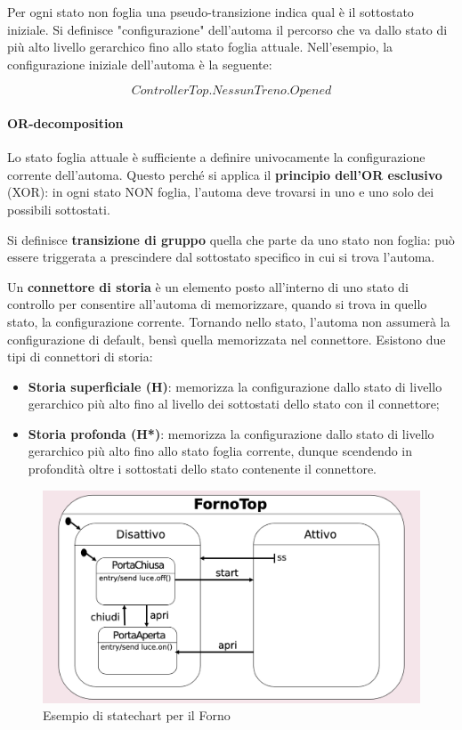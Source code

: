 Per ogni stato non foglia una pseudo-transizione indica qual è il sottostato iniziale. Si definisce "configurazione" dell'automa il percorso che va dallo stato di più alto livello gerarchico fino allo stato foglia attuale. Nell'esempio, la configurazione iniziale dell'automa è la seguente:

$$ControllerTop.NessunTreno.Opened$$

\paragraph{OR-decomposition} Lo stato foglia attuale è sufficiente a definire univocamente la configurazione corrente dell'automa. Questo perché si applica il \textbf{principio dell'OR esclusivo} (XOR): in ogni stato NON foglia, l'automa deve trovarsi in uno e uno solo dei possibili sottostati.

Si definisce \textbf{transizione di gruppo} quella che parte da uno stato non foglia: può essere triggerata a prescindere dal sottostato specifico in cui si trova l'automa. 

Un \textbf{connettore di storia} è un elemento posto all'interno di uno stato di controllo per consentire all'automa di memorizzare, quando si trova in quello stato, la configurazione corrente. Tornando nello stato, l'automa non assumerà la configurazione di default, bensì quella memorizzata nel connettore. Esistono due tipi di connettori di storia:
\begin{itemize}
    \item \textbf{Storia superficiale (H)}: memorizza la configurazione dallo stato di livello gerarchico più alto fino al livello dei sottostati dello stato con il connettore;
    \item \textbf{Storia profonda (H*)}: memorizza la configurazione dallo stato di livello gerarchico più alto fino allo stato foglia corrente, dunque scendendo in profondità oltre i sottostati dello stato contenente il connettore.
\end{itemize}

\begin{figure}[H]
    \centering
    \includegraphics[width=0.75\linewidth]{assets/UML/state/state5.png}
    \caption{Esempio di statechart per il Forno}
\end{figure}

